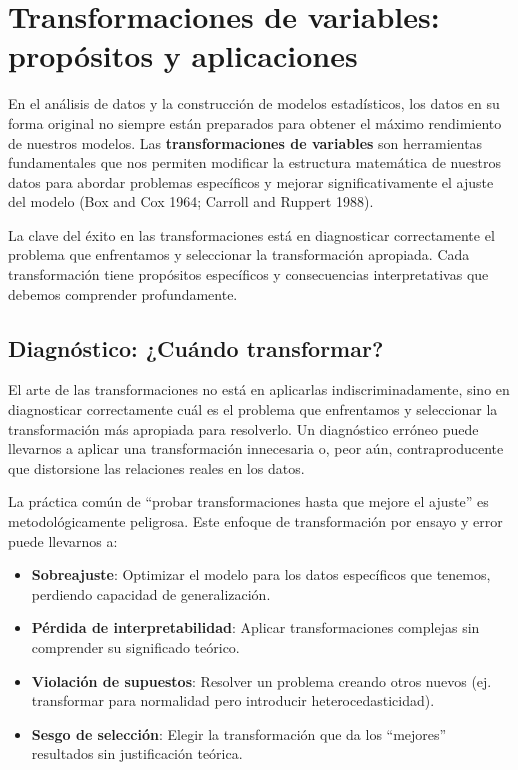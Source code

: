 \documentclass[
  letterpaper,
  DIV=11,
  numbers=noendperiod]{scrreprt}
\providecommand{\tightlist}{%
  \setlength{\itemsep}{0pt}\setlength{\parskip}{0pt}}
\begin{document}
\section{Transformaciones de variables: propósitos y
aplicaciones}\label{transformaciones-de-variables-propuxf3sitos-y-aplicaciones}

En el análisis de datos y la construcción de modelos estadísticos, los
datos en su forma original no siempre están preparados para obtener el
máximo rendimiento de nuestros modelos. Las \textbf{transformaciones de
variables} son herramientas fundamentales que nos permiten modificar la
estructura matemática de nuestros datos para abordar problemas
específicos y mejorar significativamente el ajuste del modelo (Box and
Cox 1964; Carroll and Ruppert 1988).

La clave del éxito en las transformaciones está en diagnosticar
correctamente el problema que enfrentamos y seleccionar la
transformación apropiada. Cada transformación tiene propósitos
específicos y consecuencias interpretativas que debemos comprender
profundamente.

\subsection{Diagnóstico: ¿Cuándo
transformar?}\label{diagnuxf3stico-cuuxe1ndo-transformar}

El arte de las transformaciones no está en aplicarlas
indiscriminadamente, sino en diagnosticar correctamente cuál es el
problema que enfrentamos y seleccionar la transformación más apropiada
para resolverlo. Un diagnóstico erróneo puede llevarnos a aplicar una
transformación innecesaria o, peor aún, contraproducente que distorsione
las relaciones reales en los datos.

La práctica común de ``probar transformaciones hasta que mejore el
ajuste'' es metodológicamente peligrosa. Este enfoque de transformación
por ensayo y error puede llevarnos a:

\begin{itemize}
\tightlist
\item
  \textbf{Sobreajuste}: Optimizar el modelo para los datos específicos
  que tenemos, perdiendo capacidad de generalización.
\item
  \textbf{Pérdida de interpretabilidad}: Aplicar transformaciones
  complejas sin comprender su significado teórico.
\item
  \textbf{Violación de supuestos}: Resolver un problema creando otros
  nuevos (ej. transformar para normalidad pero introducir
  heterocedasticidad).
\item
  \textbf{Sesgo de selección}: Elegir la transformación que da los
  ``mejores'' resultados sin justificación teórica.
\end{itemize}
\end{document}
